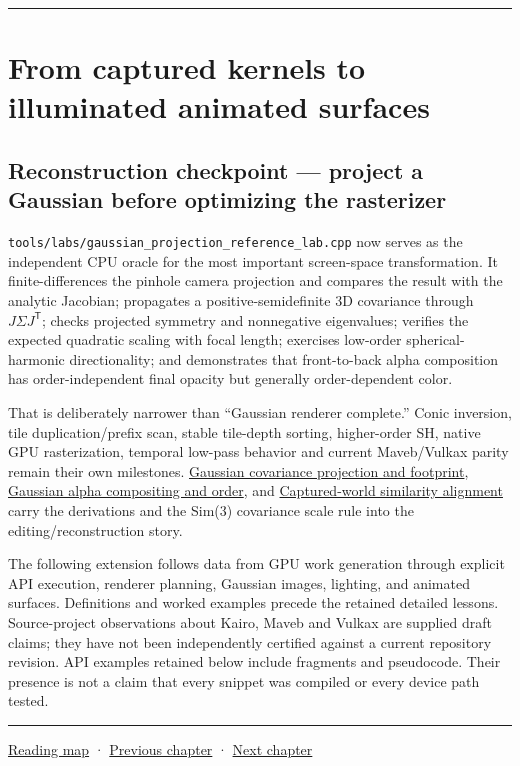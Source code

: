 \begin{center}\rule{0.5\linewidth}{0.5pt}\end{center}

\section{From captured kernels to illuminated animated surfaces}\label{04-visual-computing-ii-ch036-from-captured-kernels-to-illuminated-animated-surfaces}

\subsection{Reconstruction checkpoint --- project a Gaussian before optimizing the rasterizer}\label{04-visual-computing-ii-ch036-reconstruction-checkpoint-project-a-gaussian-before-optimizing-the-rasterizer}

\texttt{tools/labs/gaussian\_projection\_reference\_lab.cpp} now serves as the independent CPU oracle for the most important screen-space transformation. It finite-differences the pinhole camera projection and compares the result with the analytic Jacobian; propagates a positive-semidefinite 3D covariance through \(J\Sigma J^{\mathsf T}\); checks projected symmetry and nonnegative eigenvalues; verifies the expected quadratic scaling with focal length; exercises low-order spherical-harmonic directionality; and demonstrates that front-to-back alpha composition has order-independent final opacity but generally order-dependent color.

That is deliberately narrower than ``Gaussian renderer complete.'' Conic inversion, tile duplication/prefix scan, stable tile-depth sorting, higher-order SH, native GPU rasterization, temporal low-pass behavior and current Maveb/Vulkax parity remain their own milestones. \hyperref[appendix-24269cb6977c]{Gaussian covariance projection and footprint}, \hyperref[appendix-5f4b2e24c3f6]{Gaussian alpha compositing and order}, and \hyperref[appendix-5f40b4fea463]{Captured-world similarity alignment} carry the derivations and the Sim(3) covariance scale rule into the editing/reconstruction story.

The following extension follows data from GPU work generation through explicit API execution, renderer planning, Gaussian images, lighting, and animated surfaces. Definitions and worked examples precede the retained detailed lessons. Source-project observations about Kairo, Maveb and Vulkax are supplied draft claims; they have not been independently certified against a current repository revision. API examples retained below include fragments and pseudocode. Their presence is not a claim that every snippet was compiled or every device path tested.

\begin{center}\rule{0.5\linewidth}{0.5pt}\end{center}

\hyperref[volume-reading-map]{Reading map} · \hyperref[04-visual-computing-ii-ch035-a-complete-renderer-as-an-executable-forward-model]{Previous chapter} · \hyperref[04-visual-computing-ii-ch037-gaussian-splatting-and-editable-captured-worlds]{Next chapter}

